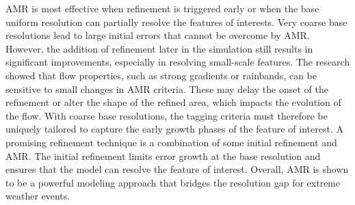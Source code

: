 AMR is most effective when refinement is triggered early 
or when the base uniform resolution can partially 
resolve the features of interests. Very coarse base resolutions
lead to large initial errors that cannot be overcome by AMR.
However, the addition of refinement later in the simulation still results
in significant improvements, especially in 
resolving small-scale features. The research showed that
flow properties, such as strong gradients or rainbands, 
can be sensitive to small changes in AMR
criteria. These may delay the onset of the refinement
 or alter the shape of the refined area, which
impacts the evolution of the flow. With coarse 
base resolutions, the tagging criteria must 
therefore be uniquely tailored to capture the early 
growth phases of the feature of interest.
A promising refinement technique is a combination of 
some initial refinement and AMR. 
The initial refinement limits error growth at the base 
resolution and ensures that the model can 
resolve the feature of interest. Overall,
AMR is shown to be a powerful modeling approach 
that bridges the resolution gap for extreme weather events.